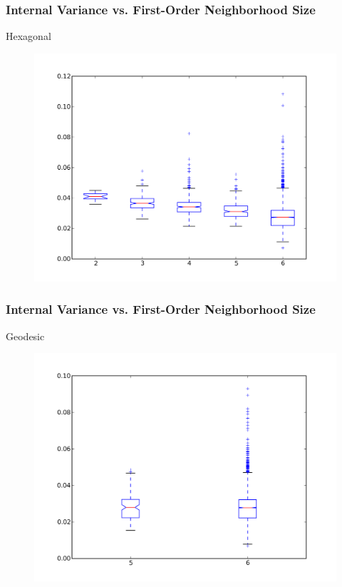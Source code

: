 \documentclass[nototal,handout]{beamer}
\begin{document}
\begin{frame}
	\frametitle{Internal Variance vs. First-Order Neighborhood Size}
 
\begin{block}{Hexagonal}
  \begin{center}
  \begin{figure}
  \includegraphics[width=0.75\linewidth]{hex_iv_box.png}
  \end{figure}
  \end{center}
 \end{block} \end{frame} 

\begin{frame}
	\frametitle{Internal Variance vs. First-Order Neighborhood Size}
 
\begin{block}{Geodesic}
  \begin{center}
  \begin{figure}
  \includegraphics[width=0.75\linewidth]{geodesic_iv_box.png}
  \end{figure}
  \end{center}
 \end{block} \end{frame} 
\end{document}
